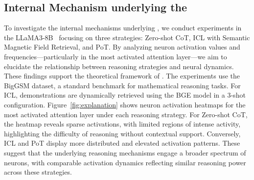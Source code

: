 \subsection{Internal Mechanism underlying the \modelname{}}
To investigate the internal mechanisms underlying \modelname{}, we conduct experiments  in the LLaMA3-8B~\cite{dubey2024llama} focusing on three strategies: Zero-shot CoT, ICL with Semantic Magnetic Field Retrieval, and PoT. By analyzing neuron activation values and frequencies—particularly in the most activated attention layer—we aim to elucidate the relationship between reasoning strategies and neural dynamics. These findings support the theoretical framework of \modelname{}.
The experiments use the BigGSM dataset, a standard benchmark for mathematical reasoning tasks. For ICL, demonstrations are dynamically retrieved using the BGE model in a 3-shot configuration.
Figure~\ref{fig:explanation} shows neuron activation heatmaps for the most activated attention layer under each reasoning strategy. For Zero-shot CoT, the heatmap reveals sparse activations, with limited regions of intense activity, highlighting the difficulty of reasoning without contextual support. Conversely, ICL and PoT display more distributed and elevated activation patterns. These suggest that the underlying reasoning mechanisms engage a broader spectrum of neurons, with comparable activation dynamics reflecting similar reasoning power across these strategies.